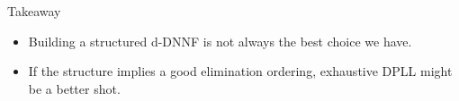 \begin{frame}[t]{Takeaway}
	\begin{itemize}
		\item Building a structured d-DNNF is not always the best choice we have.
		\item If the structure implies a good elimination ordering, exhaustive DPLL might be a better shot.
	\end{itemize}

\end{frame}
